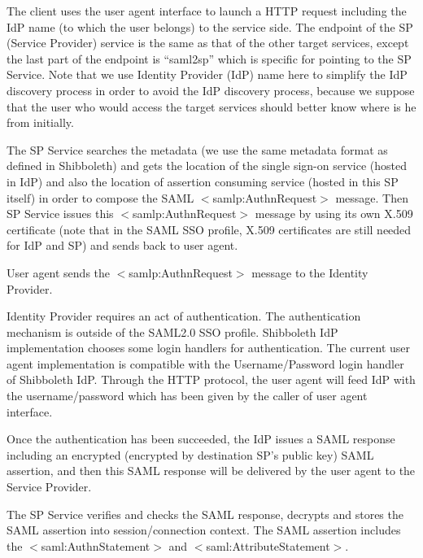 \documentclass{article}                            %
\begin{document}
  \begin{list}{.}
  {\setlength{\rightmargin}{\leftmargin}}
    \item The client uses the user agent interface to launch a HTTP request including the IdP name (to which the user belongs) to the service side. The endpoint of the SP (Service Provider) service is the same as that of the other target services, except the last part of the endpoint is ``saml2sp'' which is specific for pointing to the SP Service. Note that we use Identity Provider (IdP) name here to simplify the IdP discovery process in order to avoid the IdP discovery process, because we suppose that the user who would access the target services should better know where is he from initially.

    \item The SP Service searches the metadata (we use the same metadata format as defined in Shibboleth) and gets the location of the single sign-on service (hosted in IdP) and also the location of assertion consuming service (hosted in this SP itself) in order to compose the SAML $<$samlp:AuthnRequest$>$ message. Then SP Service issues this $<$samlp:AuthnRequest$>$ message by using its own X.509 certificate (note that in the SAML SSO profile, X.509 certificates are still needed for IdP and SP) and sends back to user agent.

    \item User agent sends the $<$samlp:AuthnRequest$>$ message to the Identity Provider.

    \item Identity Provider requires an act of authentication. The authentication mechanism is outside of the SAML2.0 SSO profile. Shibboleth IdP implementation chooses some login handlers for authentication. The current user agent implementation is compatible with the Username/Password login handler of Shibboleth IdP. Through the HTTP protocol, the user agent will feed IdP with the username/password which has been given by the caller of user agent interface.

    \item Once the authentication has been succeeded, the IdP issues a SAML response including an encrypted (encrypted by destination SP’s public key) SAML assertion, and then this SAML response will be delivered by the user agent to the Service Provider.

    \item The SP Service verifies and checks the SAML response, decrypts and stores the SAML assertion into session/connection context. The SAML assertion includes the $<$saml:AuthnStatement$>$ and $<$saml:AttributeStatement$>$.


\end{list}
\end{document}

